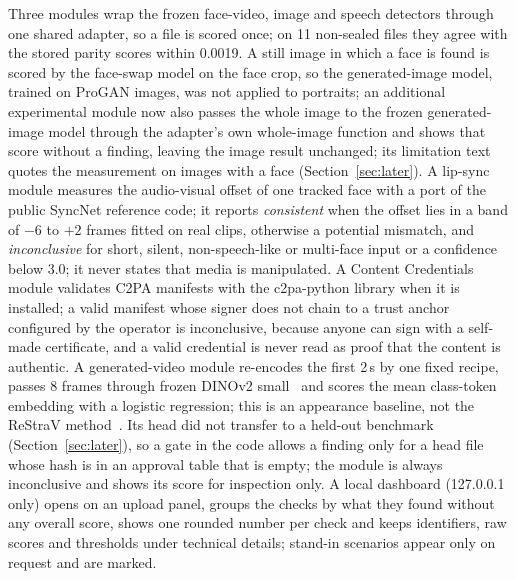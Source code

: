 \documentclass[conference,a4paper]{IEEEtran_nodash}
\begin{document}
Three modules wrap the frozen face-video, image and speech detectors through one
shared adapter, so a file is scored once; on 11 non-sealed files they agree with
the stored parity scores within 0.0019. %
A still image in which a face is found is scored by the face-swap model on the
face crop, so the generated-image model, trained on ProGAN images, was not applied to portraits; an additional
experimental module now also passes the whole image to the frozen generated-image
model through the adapter's own whole-image function and shows that score without
a finding, leaving the image result unchanged; its limitation text quotes the
measurement on images with a face (Section~\ref{sec:later}). %
A lip-sync module measures the audio-visual offset of one tracked face with a
port of the public SyncNet reference code; it reports \emph{consistent} when the
offset lies in a band of $-6$ to $+2$ frames fitted on real clips, otherwise a
potential mismatch, and \emph{inconclusive} for short, silent, non-speech-like
or multi-face input or a confidence below 3.0; it never states that media is
manipulated. %
A Content Credentials module validates C2PA manifests with the c2pa-python
library when it is installed; a valid manifest whose signer does not chain to a
trust anchor configured by the operator is inconclusive, because anyone can sign
with a self-made certificate, and a valid credential is never read as proof that
the content is authentic. A generated-video module re-encodes the first 2\,s by
one fixed recipe, passes 8 frames through frozen DINOv2 small~\cite{oquab2024dinov2}
and scores the mean class-token embedding with a logistic regression; this is an
appearance baseline, not the ReStraV method~\cite{interno2025restrav}. Its head
did not transfer to a held-out benchmark (Section~\ref{sec:later}), so a gate in
the code allows a finding only for a head file whose hash is in an approval
table that is empty; the module is always inconclusive and shows its score for
inspection only. A local dashboard (127.0.0.1 only) opens on an upload panel,
groups the checks by what they found without any overall score, shows one rounded
number per check and keeps identifiers, raw scores and thresholds under technical
details; stand-in scenarios appear only on request and are marked. %
\end{document}
